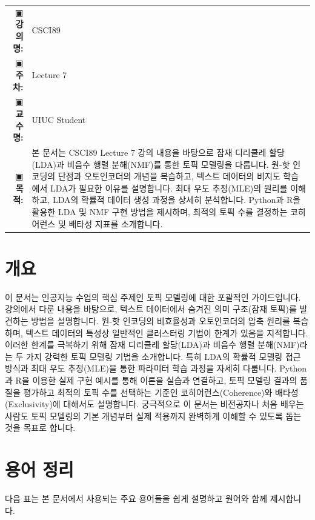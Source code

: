 \documentclass[11pt,a4paper]{article}
\makeatletter
\theoremstyle{definition}
\newcommand{\newsection}[1]{\newpage\section{#1}}
\newcommand{\metainfo}[4]{
\begin{tcolorbox}[
    colback=lightpurple,
    colframe=darkpurple,
    boxrule=1pt,
    arc=2mm,
    left=10pt,
    right=10pt,
    top=8pt,
    bottom=8pt
]
\begin{tabular}{@{}rl@{}}
▣ \textbf{강의명:} & #1 \\[0.3em]
▣ \textbf{주차:} & #2 \\[0.3em]
▣ \textbf{교수명:} & #3 \\[0.3em]
▣ \textbf{목적:} & \begin{minipage}[t]{0.75\textwidth}#4\end{minipage}
\end{tabular}
\end{tcolorbox}
}
\makeatother
\begin{document}
\thispagestyle{firstpage}

\metainfo{CSCI89}{Lecture 7}{UIUC Student}{본 문서는 CSCI89 Lecture 7 강의 내용을 바탕으로 잠재 디리클레 할당(LDA)과 비음수 행렬 분해(NMF)를 통한 토픽 모델링을 다룹니다. 원-핫 인코딩의 단점과 오토인코더의 개념을 복습하고, 텍스트 데이터의 비지도 학습에서 LDA가 필요한 이유를 설명합니다. 최대 우도 추정(MLE)의 원리를 이해하고, LDA의 확률적 데이터 생성 과정을 상세히 분석합니다. Python과 R을 활용한 LDA 및 NMF 구현 방법을 제시하며, 최적의 토픽 수를 결정하는 코히어런스 및 배타성 지표를 소개합니다.}

\tableofcontents

\newpage

\newsection{개요}
이 문서는 인공지능 수업의 핵심 주제인 토픽 모델링에 대한 포괄적인 가이드입니다.
강의에서 다룬 내용을 바탕으로, 텍스트 데이터에서 숨겨진 의미 구조(잠재 토픽)를 발견하는 방법을 설명합니다.
원-핫 인코딩의 비효율성과 오토인코더의 압축 원리를 복습하며, 텍스트 데이터의 특성상 일반적인 클러스터링 기법이 한계가 있음을 지적합니다.
이러한 한계를 극복하기 위해 잠재 디리클레 할당(LDA)과 비음수 행렬 분해(NMF)라는 두 가지 강력한 토픽 모델링 기법을 소개합니다.
특히 LDA의 확률적 모델링 접근 방식과 최대 우도 추정(MLE)을 통한 파라미터 학습 과정을 자세히 다룹니다.
Python과 R을 이용한 실제 구현 예시를 통해 이론을 실습과 연결하고, 토픽 모델링 결과의 품질을 평가하고 최적의 토픽 수를 선택하는 기준인 코히어런스(Coherence)와 배타성(Exclusivity)에 대해서도 설명합니다.
궁극적으로 이 문서는 비전공자나 처음 배우는 사람도 토픽 모델링의 기본 개념부터 실제 적용까지 완벽하게 이해할 수 있도록 돕는 것을 목표로 합니다.

\newsection{용어 정리}
다음 표는 본 문서에서 사용되는 주요 용어들을 쉽게 설명하고 원어와 함께 제시합니다.
\end{document}
